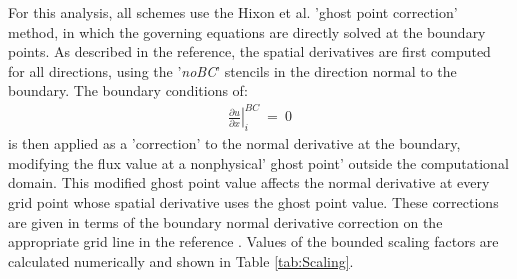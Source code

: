 \documentclass[conf]{new-aiaa}
\begin{document}
For this analysis, all schemes use the Hixon et al. 'ghost point correction' method, \cite{GPT, RDRP} in which the governing equations are directly solved at the boundary points. 
As described in the reference, the spatial derivatives are first computed for all directions, using the '\textit{noBC}' stencils in the direction normal to the boundary. 
The boundary conditions of:
\begin{equation}
	\begin{split}
		\label{eq:}
  			\left.\frac{\partial{u}}{\partial{x}}\right|_i^{BC}~=~0
	\end{split}
\end{equation}
is then applied as a 'correction' to the normal derivative at the boundary, modifying the flux value at a nonphysical' ghost point' outside the computational domain.
This modified ghost point value affects the normal derivative at every grid point whose spatial derivative uses the ghost point value. 
These corrections are given in terms of the boundary normal derivative correction on the appropriate grid line in the reference \cite{GPT, RDRP}. Values of the bounded scaling factors are calculated numerically and shown in Table \ref{tab:Scaling}.
\end{document}

